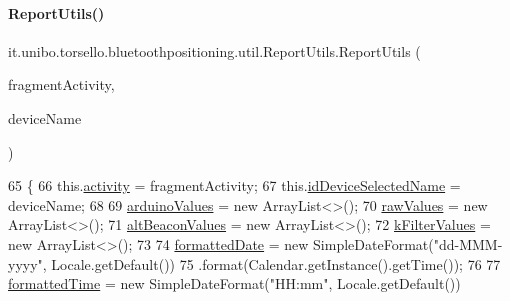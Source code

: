 \paragraph{\texorpdfstring{Report\+Utils()}{ReportUtils()}}
{\footnotesize\ttfamily it.\+unibo.\+torsello.\+bluetoothpositioning.\+util.\+Report\+Utils.\+Report\+Utils (\begin{DoxyParamCaption}\item[{Fragment\+Activity}]{fragment\+Activity,  }\item[{String}]{device\+Name }\end{DoxyParamCaption})}


\begin{DoxyCode}
65                                                                              \{
66         this.\hyperlink{classit_1_1unibo_1_1torsello_1_1bluetoothpositioning_1_1util_1_1ReportUtils_ae36eb3321f2d7f96753d7854f5cb6923_ae36eb3321f2d7f96753d7854f5cb6923}{activity} = fragmentActivity;
67         this.\hyperlink{classit_1_1unibo_1_1torsello_1_1bluetoothpositioning_1_1util_1_1ReportUtils_a4c838a130a922b6f26b79c7d7bdcaf9c_a4c838a130a922b6f26b79c7d7bdcaf9c}{idDeviceSelectedName} = deviceName;
68 
69         \hyperlink{classit_1_1unibo_1_1torsello_1_1bluetoothpositioning_1_1util_1_1ReportUtils_a3557dcc1662461b46fcd4d18eee9780e_a3557dcc1662461b46fcd4d18eee9780e}{arduinoValues} = \textcolor{keyword}{new} ArrayList<>();
70         \hyperlink{classit_1_1unibo_1_1torsello_1_1bluetoothpositioning_1_1util_1_1ReportUtils_adbe56bea0813a48932ef94b8b27c3314_adbe56bea0813a48932ef94b8b27c3314}{rawValues} = \textcolor{keyword}{new} ArrayList<>();
71         \hyperlink{classit_1_1unibo_1_1torsello_1_1bluetoothpositioning_1_1util_1_1ReportUtils_a6e72cc0d840390d44e6cbccece68e240_a6e72cc0d840390d44e6cbccece68e240}{altBeaconValues} = \textcolor{keyword}{new} ArrayList<>();
72         \hyperlink{classit_1_1unibo_1_1torsello_1_1bluetoothpositioning_1_1util_1_1ReportUtils_a9a40344497c5522bbc90f03581c2713a_a9a40344497c5522bbc90f03581c2713a}{kFilterValues} = \textcolor{keyword}{new} ArrayList<>();
73 
74         \hyperlink{classit_1_1unibo_1_1torsello_1_1bluetoothpositioning_1_1util_1_1ReportUtils_a0339d8306f408d438720a67d1801f46c_a0339d8306f408d438720a67d1801f46c}{formattedDate} = \textcolor{keyword}{new} SimpleDateFormat(\textcolor{stringliteral}{"dd-MMM-yyyy"}, Locale.getDefault())
75                 .format(Calendar.getInstance().getTime());
76 
77         \hyperlink{classit_1_1unibo_1_1torsello_1_1bluetoothpositioning_1_1util_1_1ReportUtils_a6e6b0d302bb7d2e8f128154f0a80965c_a6e6b0d302bb7d2e8f128154f0a80965c}{formattedTime} = \textcolor{keyword}{new} SimpleDateFormat(\textcolor{stringliteral}{"HH:mm"}, Locale.getDefault())

\end{DoxyCode}
